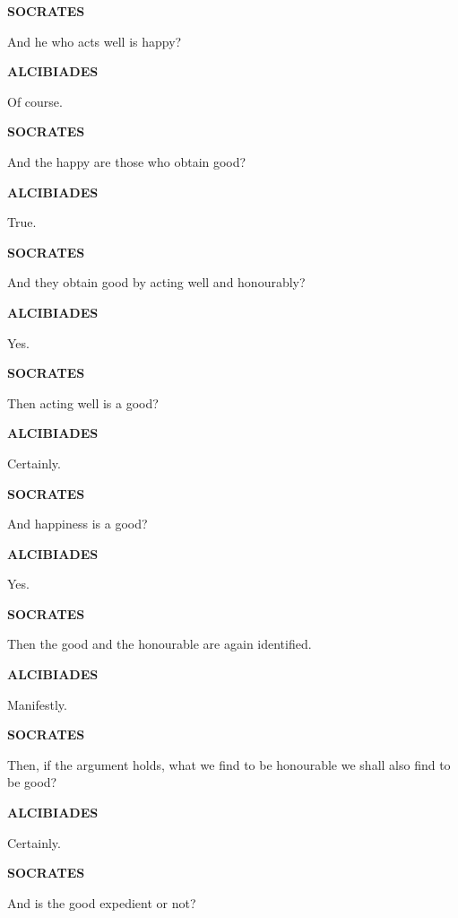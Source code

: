 \documentclass[11pt,letter]{article}
\begin{document}
\par \textbf{SOCRATES}
\par   And he who acts well is happy?

\par \textbf{ALCIBIADES}
\par   Of course.

\par \textbf{SOCRATES}
\par   And the happy are those who obtain good?

\par \textbf{ALCIBIADES}
\par   True.

\par \textbf{SOCRATES}
\par   And they obtain good by acting well and honourably?

\par \textbf{ALCIBIADES}
\par   Yes.

\par \textbf{SOCRATES}
\par   Then acting well is a good?

\par \textbf{ALCIBIADES}
\par   Certainly.

\par \textbf{SOCRATES}
\par   And happiness is a good?

\par \textbf{ALCIBIADES}
\par   Yes.

\par \textbf{SOCRATES}
\par   Then the good and the honourable are again identified.

\par \textbf{ALCIBIADES}
\par   Manifestly.

\par \textbf{SOCRATES}
\par   Then, if the argument holds, what we find to be honourable we shall also find to be good?

\par \textbf{ALCIBIADES}
\par   Certainly.

\par \textbf{SOCRATES}
\par   And is the good expedient or not?
\end{document}
